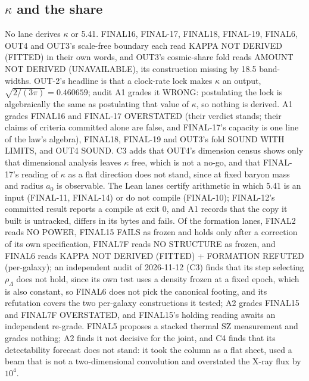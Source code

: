 \documentclass[10pt]{article}
\begin{document}
\subsection{$\kappa$ and the share}
No lane derives $\kappa$ or 5.41. FINAL16, FINAL-17, FINAL18, FINAL-19, FINAL6, OUT4 and OUT3's scale-free boundary each read KAPPA NOT DERIVED (FITTED) in their own words, and OUT3's cosmic-share fold reads AMOUNT NOT DERIVED (UNAVAILABLE), its construction missing by 18.5 band-widths. OUT-2's headline is that a clock-rate lock makes $\kappa$ an output, $\sqrt{2/(3\pi)}=0.460659$; audit A1 grades it WRONG: postulating the lock is algebraically the same as postulating that value of $\kappa$, so nothing is derived. A1 grades FINAL16 and FINAL-17 OVERSTATED (their verdict stands; their claims of criteria committed alone are false, and FINAL-17's capacity is one line of the law's algebra), FINAL18, FINAL-19 and OUT3's fold SOUND WITH LIMITS, and OUT4 SOUND. C3 adds that OUT4's dimension census shows only that dimensional analysis leaves $\kappa$ free, which is not a no-go, and that FINAL-17's reading of $\kappa$ as a flat direction does not stand, since at fixed baryon mass and radius $a_0$ is observable. The Lean lanes certify arithmetic in which 5.41 is an input (FINAL-11, FINAL-14) or do not compile (FINAL-10); FINAL-12's committed result reports a compile at exit 0, and A1 records that the copy it built is untracked, differs in its bytes and fails. Of the formation lanes, FINAL2 reads NO POWER, FINAL15 FAILS as frozen and holds only after a correction of its own specification, FINAL7F reads NO STRUCTURE as frozen, and FINAL6 reads KAPPA NOT DERIVED (FITTED) + FORMATION REFUTED (per-galaxy); an independent audit of 2026-11-12 (C3) finds that its step selecting $\rho_\Lambda$ does not hold, since its own test uses a density frozen at a fixed epoch, which is also constant, so FINAL6 does not pick the canonical footing, and its refutation covers the two per-galaxy constructions it tested; A2 grades FINAL15 and FINAL7F OVERSTATED, and FINAL15's holding reading awaits an independent re-grade. FINAL5 proposes a stacked thermal SZ measurement and grades nothing; A2 finds it not decisive for the joint, and C4 finds that its detectability forecast does not stand: it took the column as a flat sheet, used a beam that is not a two-dimensional convolution and overstated the X-ray flux by $10^4$.
\end{document}
